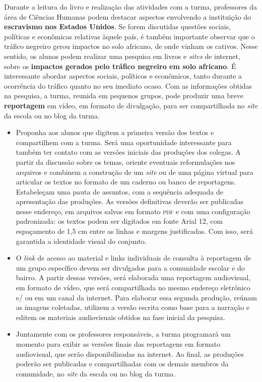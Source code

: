 \documentclass[12pt]{extarticle}
\begin{document}
Durante a leitura do livro e realização das atividades com a
turma, professores da área de Ciências Humanas podem destacar aspectos
envolvendo a instituição do \textbf{escravismo nos Estados Unidos}. Se
forem discutidas questões sociais, políticas e econômicas relativas
àquele país, é também importante observar que o tráfico negreiro gerou
impactos no solo africano, de onde vinham os cativos. Nesse sentido, os
alunos podem realizar uma pesquisa em livros e \emph{sites} de internet,
sobre os \textbf{impactos gerados pelo tráfico negreiro em solo
africano}. É interessante abordar aspectos sociais, políticos e
econômicos, tanto durante a ocorrência do tráfico quanto no seu imediato
ocaso. Com as informações obtidas na pesquisa, a turma, reunida em
pequenos grupos, pode produzir uma breve \textbf{reportagem} em vídeo,
em formato de divulgação, para ser compartilhada no \emph{site} da
escola ou no blog da turma.

\begin{itemize}
\item
  Proponha aos alunos que digitem a primeira versão dos textos e
  compartilhem com a turma. Será uma oportunidade interessante para
  também ter contato com as versões iniciais das produções dos colegas.
  A partir da discussão sobre os temas, oriente eventuais reformulações
  nos arquivos e combinem a construção de um \emph{site} ou de uma
  página virtual para articular os textos no formato de um caderno ou
  banco de reportagens. Estabeleçam uma pauta de assuntos, com a
  sequência adequada de apresentação das produções. As versões
  definitivas deverão ser publicadas nesse endereço, em arquivos salvos
  em formato \textsc{pdf} e com uma configuração padronizada: os textos podem ser
  digitados em fonte Arial 12, com espaçamento de 1,5 cm entre as linhas
  e margens justificadas. Com isso, será garantida a identidade visual
  do conjunto.
\item
  O \emph{link} de acesso ao material e links individuais de consulta à
  reportagem de um grupo específico devem ser divulgados para a
  comunidade escolar e do bairro. A partir dessas versões, será
  elaborada uma reportagem audiovisual, em formato de vídeo, que será
  compartilhada no mesmo endereço eletrônico e/ ou em um canal da
  internet. Para elaborar essa segunda produção, reúnam as imagens
  coletadas, utilizem a versão escrita como base para a narração e
  editem os materiais audiovisuais obtidos na fase inicial da pesquisa.
\item
  Juntamente com os professores responsáveis, a turma programará um
  momento para exibir as versões finais das reportagens em formato
  audiovisual, que serão disponibilizadas na internet. Ao final, as
  produções poderão ser publicadas e compartilhadas com os demais
  membros da comunidade, no \emph{site} da escola ou no blog da turma.
\end{itemize}
\end{document}
